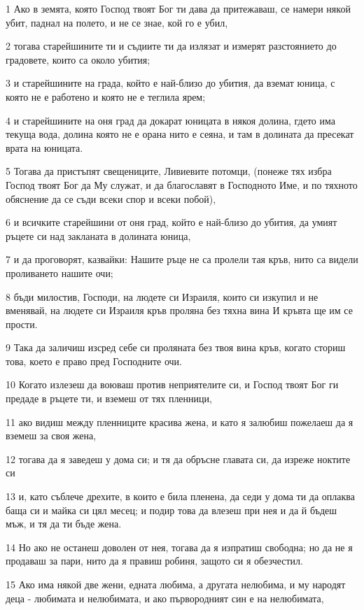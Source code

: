 \par 1 Ако в земята, която Господ твоят Бог ти дава да притежаваш, се намери някой убит, паднал на полето, и не се знае, кой го е убил,
\par 2 тогава старейшините ти и съдиите ти да излязат и измерят разстоянието до градовете, които са около убития;
\par 3 и старейшините на града, който е най-близо до убития, да вземат юница, с която не е работено и която не е теглила ярем;
\par 4 и старейшините на оня град да докарат юницата в някоя долина, гдето има текуща вода, долина която не е орана нито е сеяна, и там в долината да пресекат врата на юницата.
\par 5 Тогава да пристъпят свещениците, Ливиевите потомци, (понеже тях избра Господ твоят Бог да Му служат, и да благославят в Господното Име, и по тяхното обяснение да се съди всеки спор и всеки побой),
\par 6 и всичките старейшини от оня град, който е най-близо до убития, да умият ръцете си над закланата в долината юница,
\par 7 и да проговорят, казвайки: Нашите ръце не са пролели тая кръв, нито са видели проливането нашите очи;
\par 8 бъди милостив, Господи, на людете си Израиля, които си изкупил и не вменявай, на людете си Израиля кръв проляна без тяхна вина И кръвта ще им се прости.
\par 9 Така да заличиш изсред себе си проляната без твоя вина кръв, когато сториш това, което е право пред Господните очи.
\par 10 Когато излезеш да воюваш против неприятелите си, и Господ твоят Бог ги предаде в ръцете ти, и вземеш от тях пленници,
\par 11 ако видиш между пленниците красива жена, и като я залюбиш пожелаеш да я вземеш за своя жена,
\par 12 тогава да я заведеш у дома си; и тя да обръсне главата си, да изреже ноктите си
\par 13 и, като съблече дрехите, в които е била пленена, да седи у дома ти да оплаква баща си и майка си цял месец; и подир това да влезеш при нея и да й бъдеш мъж, и тя да ти бъде жена.
\par 14 Но ако не останеш доволен от нея, тогава да я изпратиш свободна; но да не я продаваш за пари, нито да я правиш робиня, защото си я обезчестил.
\par 15 Ако има някой две жени, едната любима, а другата нелюбима, и му народят деца - любимата и нелюбимата, и ако първородният син е на нелюбимата,
